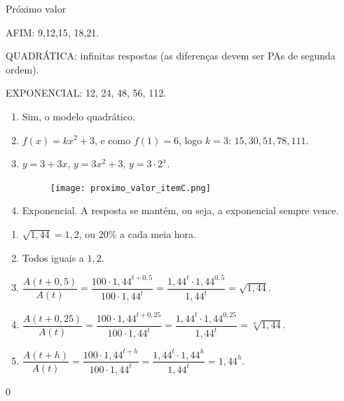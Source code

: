 \begin{answer}{Próximo valor}
{
AFIM: 9,12,15, 18,21.

QUADRÁTICA: infinitas respostas (as diferenças devem ser PAs de segunda ordem).

EXPONENCIAL: 12, 24, 48, 56, 112.

\begin{enumerate}

\item Sim, o modelo quadrático.

\item $f(x)=kx^2+3$, e como $f(1)=6$, logo $k=3$: $15, 30, 51, 78, 111$.

\item $y=3+3x$, $y=3x^2+3$, $y=3\cdot 2^x$.

\begin{figure}[H]
\centering
\noindent\texttt{[image: proximo\_valor\_itemC.png]}
\end{figure}

\item Exponencial. A resposta se mantém, ou seja, a exponencial sempre vence.

\end{enumerate}


\begin{enumerate}
\item $\sqrt{1,44}=1,2$, ou $20\%$ a cada meia hora.

\item Todos iguais a $1,2$.

\item $\dfrac{A(t+0,5)}{A(t)}=\dfrac{100\cdot 1,44^{t+0,5}}{100\cdot 1,44^t}=\dfrac{1,44^t \cdot 1,44^{0,5}}{1,44^t}=\sqrt{1,44}$.

\item $\dfrac{A(t+0,25)}{A(t)}=\dfrac{100\cdot 1,44^{t+0,25}}{100\cdot 1,44^t}=\dfrac{1,44^t \cdot 1,44^{0,25}}{1,44^t}=\sqrt[4]{1,44}$.

\item $\dfrac{A(t+h)}{A(t)}=\dfrac{100\cdot 1,44^{t+h}}{100\cdot 1,44^t}=\dfrac{1,44^t \cdot 1,44^{h}}{1,44^t}=1,44^h$.

\end{enumerate}
}{0}
\end{answer}


